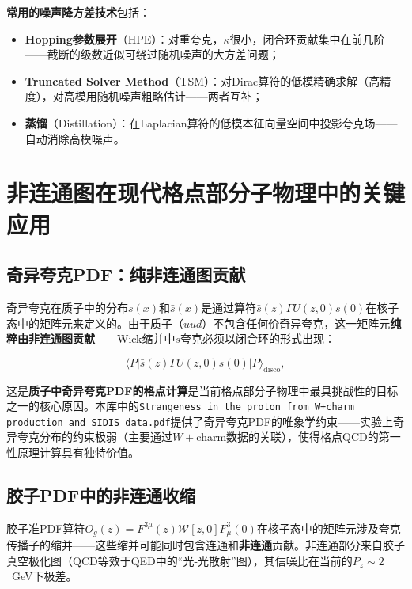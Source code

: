 \documentclass[12pt,a4paper]{ctexart}
\theoremstyle{definition}
\begin{document}
\textbf{常用的噪声降方差技术}包括：
\begin{itemize}[nosep]
    \item \textbf{Hopping参数展开}（HPE）：对重夸克，$\kappa$很小，闭合环贡献集中在前几阶——截断的级数近似可绕过随机噪声的大方差问题；
    \item \textbf{Truncated Solver Method}（TSM）：对Dirac算符的低模精确求解（高精度），对高模用随机噪声粗略估计——两者互补；
    \item \textbf{蒸馏}（Distillation）：在Laplacian算符的低模本征向量空间中投影夸克场——自动消除高模噪声。
\end{itemize}

\section{非连通图在现代格点部分子物理中的关键应用}

\subsection{奇异夸克PDF：纯非连通图贡献}

奇异夸克在质子中的分布$s(x)$和$\bar s(x)$是通过算符$\bar s(z)\Gamma U(z,0) s(0)$在核子态中的矩阵元来定义的。由于质子（$uud$）不包含任何价奇异夸克，这一矩阵元\textbf{纯粹由非连通图贡献}——Wick缩并中$s$夸克必须以闭合环的形式出现：

\begin{equation}
\langle P | \bar s(z)\Gamma U(z,0) s(0) | P \rangle_{\text{disco}},
\label{eq:strange_disco}
\end{equation}

这是\textbf{质子中奇异夸克PDF的格点计算}是当前格点部分子物理中最具挑战性的目标之一的核心原因。本库中的\texttt{Strangeness in the proton from W+charm production and SIDIS data.pdf}提供了奇异夸克PDF的唯象学约束——实验上奇异夸克分布的约束极弱（主要通过$W+$charm数据的关联），使得格点QCD的第一性原理计算具有独特价值。

\subsection{胶子PDF中的非连通收缩}

胶子准PDF算符$O_g(z) = F^{3\mu}(z)\mathcal{W}[z,0]F_\mu^3(0)$在核子态中的矩阵元涉及夸克传播子的缩并——这些缩并可能同时包含连通和\textbf{非连通}贡献。非连通部分来自胶子真空极化图（QCD等效于QED中的``光-光散射''图），其信噪比在当前的$P_z \sim 2$~GeV下极差。
\end{document}
